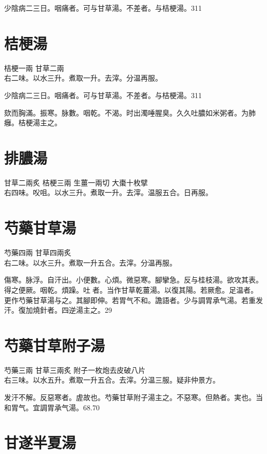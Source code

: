 少陰病二三日。咽痛者。可与甘草湯。不差者。与桔梗湯。311

\section{桔梗湯}

桔梗{\scriptsize 一兩} 甘草{\scriptsize 二兩}\\
右二味。以水三升。煮取一升。去滓。分温再服。

少陰病二三日。咽痛者。可与甘草湯。不差者。与桔梗湯。311

欬而胸滿。振寒。脉數。咽乾。不渴。时出濁唾腥臭。久久吐膿如米粥者。为肺癰。桔梗湯主之。

\section{排膿湯}

甘草{\scriptsize 二兩炙} 桔梗{\scriptsize 三兩} 生薑{\scriptsize 一兩切} 大棗{\scriptsize 十枚擘}\\
右四味。㕮咀。以水三升。煮取一升。去滓。温服五合。日再服。

\section{芍藥甘草湯}

芍藥{\scriptsize 四兩} 甘草{\scriptsize 四兩炙}\\
右二味。以水三升。煮取一升五合。去滓。分温再服。

傷寒。脉浮。自汗出。小便數。心煩。微惡寒。腳攣急。反与桂枝湯。欲攻其表。得之便厥。咽乾。煩躁。吐{\sungtpii 𠱘}者。当作甘草乾薑湯。以復其陽。若厥愈。足温者。更作芍藥甘草湯与之。其腳即伸。若胃气不和。譫語者。少与{\khaaitp 調胃}承气湯。若重发汗。復加燒針者。四逆湯主之。29

\section{芍藥甘草附子湯}

芍藥{\scriptsize 三兩} 甘草{\scriptsize 三兩炙} 附子{\scriptsize 一枚炮去皮破八片}\\
右三味。以水五升。煮取一升五合。去滓。分温三服。疑非仲景方。

发汗不解。反惡寒者。虗故也。芍藥甘草附子湯主之。不惡寒。但熱者。実也。当和胃气。宜調胃承气湯。68.70

\section{甘遂半夏湯}

